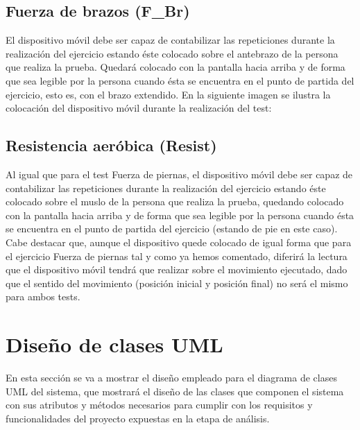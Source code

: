 
\subsection{Fuerza de brazos (F\_Br)}

El dispositivo móvil debe ser capaz de contabilizar las repeticiones durante la realización del ejercicio estando éste colocado sobre el antebrazo de la persona que realiza la prueba. Quedará colocado con la pantalla hacia arriba y de forma que sea legible por la persona cuando ésta se encuentra en el punto de partida del ejercicio, esto es, con el brazo extendido. En la siguiente imagen se ilustra la colocación del dispositivo móvil durante la realización del test:


\subsection{Resistencia aeróbica (Resist)}

Al igual que para el test Fuerza de piernas, el dispositivo móvil debe ser capaz de contabilizar las repeticiones durante la realización del ejercicio estando éste colocado sobre el muslo de la persona que realiza la prueba, quedando colocado con la pantalla hacia arriba y de forma que sea legible por la persona cuando ésta se encuentra en el punto de partida del ejercicio (estando de pie en este caso).\\

Cabe destacar que, aunque el dispositivo quede colocado de igual forma que para el ejercicio Fuerza de piernas tal y como ya hemos comentado, diferirá la lectura que el dispositivo móvil tendrá que realizar sobre el movimiento ejecutado, dado que el sentido del movimiento (posición inicial y posición final) no será el mismo para ambos tests.

\section{Diseño de clases UML}

En esta sección se va a mostrar el diseño empleado para el diagrama de clases UML del sistema, que mostrará el diseño de las clases que componen el sistema con sus atributos y métodos necesarios para cumplir con los requisitos y funcionalidades del proyecto expuestas en la etapa de análisis.\\

